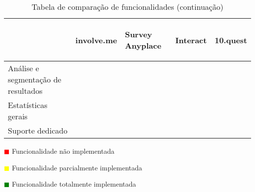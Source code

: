 \renewcommand{\arraystretch}{2}
\setlength\arrayrulewidth{1pt}
\begin{table}[!ht]  
	\begin{center}
		\begin{tabular}{|p{4cm}|p{0.1cm}|p{0.1cm}|p{0.1cm}|p{0.1cm}|}
			\cline{2-5}
			\multicolumn{1}{c|}{} & \hspace{0.2cm}\begin{sideways}involve.me\end{sideways} & \hspace{0.4cm}\begin{sideways}Survey Anyplace\end{sideways} & \hspace{0.2cm}\begin{sideways}Interact\end{sideways} &\hspace{0.2cm}\begin{sideways} 10.quest\end{sideways}\\ \hline
			
			Análise e segmentação de resultados & \cellcolor{green!80}  & \cellcolor{green!80}  & \cellcolor{green!80} & \cellcolor{green!80} \\ \hline
			
			Estatísticas gerais & \cellcolor{yellow!80}  & \cellcolor{red!80}  & \cellcolor{red!80} & \cellcolor{green!80} \\ \hline
			
			Suporte dedicado & \cellcolor{green!80}  & \cellcolor{green!80}  & \cellcolor{green!80} & \cellcolor{green!80} \\ \hline
			
			
			
			
		\end{tabular}
	\end{center}
	\hspace{1.2cm}	\textcolor{red}{$\blacksquare$} Funcionalidade não implementada
	
	\hspace{1.2cm}     \textcolor{yellow}{$\blacksquare$} Funcionalidade parcialmente implementada
	
	\hspace{1.2cm}     \textcolor{green}{$\blacksquare$} Funcionalidade totalmente implementada 
	\begin{center}
		\caption{Tabela de comparação de funcionalidades (continuação)}
		\label{tab:comparacao3}
	\end{center}
\end{table}

\pagebreak
\blankpage

\glsresetall




